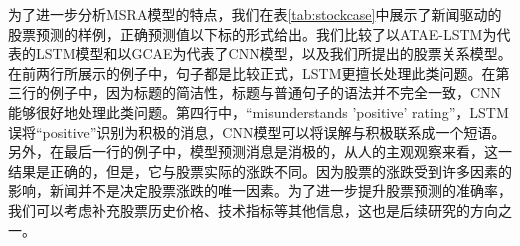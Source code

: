 为了进一步分析MSRA模型的特点，我们在表\ref{tab:stockcase}中展示了新闻驱动的股票预测的样例，正确预测值以下标的形式给出。我们比较了以ATAE-LSTM为代表的LSTM模型和以GCAE为代表了CNN模型，以及我们所提出的股票关系模型。在前两行所展示的例子中，句子都是比较正式，LSTM更擅长处理此类问题。在第三行的例子中，因为标题的简洁性，标题与普通句子的语法并不完全一致，CNN能够很好地处理此类问题。第四行中，“misunderstands 'positive' rating”，LSTM误将“positive”识别为积极的消息，CNN模型可以将误解与积极联系成一个短语。另外，在最后一行的例子中，模型预测消息是消极的，从人的主观观察来看，这一结果是正确的，但是，它与股票实际的涨跌不同。因为股票的涨跌受到许多因素的影响，新闻并不是决定股票涨跌的唯一因素。为了进一步提升股票预测的准确率，我们可以考虑补充股票历史价格、技术指标等其他信息，这也是后续研究的方向之一。


